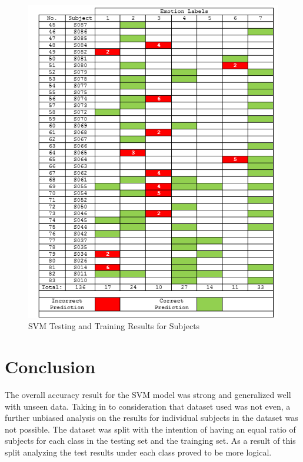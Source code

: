 \begin{figure}[H]
  \centering
  \includegraphics[scale=1.5]{res2}
  \caption{SVM Testing and Training Results for Subjects}
  \label{fig: res2}
\end{figure} 


\section{Conclusion}
The overall accuracy result for the SVM model was strong and generalized well with unseen data. Taking in to consideration that dataset used was not even, a further unbiased analysis on the results for individual subjects in the dataset was not possible. The dataset was split with the intention of having an equal ratio of subjects for each class in the testing set and the trainging set. As a result of this split analyzing the test results under each class proved to be more logical.








